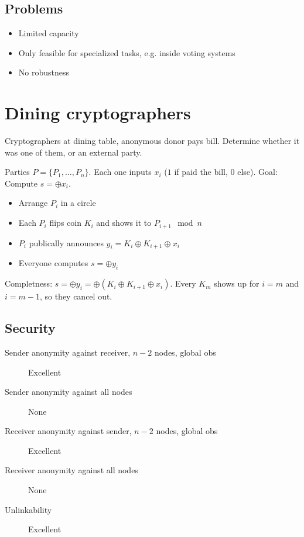\documentclass[a4paper]{scrreprt}
\begin{document}
\subsection{Problems}

\begin{itemize}
		\item Limited capacity
		\item Only feasible for specialized tasks, e.g. inside voting systems
		\item No robustness
\end{itemize}

\section{Dining cryptographers}

Cryptographers at dining table, anonymous donor pays bill. Determine whether it
was one of them, or an external party.

Parties $P = \{P_1, \ldots, P_n\}$. Each one inputs $x_i$ ($1$ if paid the
bill, $0$ else). Goal: Compute $s = \oplus x_i$.

\begin{itemize}
		\item Arrange $P_i$ in a circle
		\item Each $P_i$ flips coin $K_i$ and shows it to $P_{i+1} \mod n$
		\item $P_i$ publically announces $y_i = K_i \oplus K_{i+1} \oplus x_i$
		\item Everyone computes $s = \oplus y_i$
\end{itemize}

Completness: $s = \oplus y_i = \oplus (K_i \oplus K_{i+1} \oplus x_i)$. Every
$K_m$ shows up for $i=m$ and $i=m-1$, so they cancel out.

\subsection{Security}

\begin{description}
		\item[Sender anonymity against receiver, $n-2$ nodes, global obs] Excellent
		\item[Sender anonymity against all nodes] None
		\item[Receiver anonymity against sender, $n-2$ nodes, global obs] Excellent
		\item[Receiver anonymity against all nodes] None
		\item[Unlinkability] Excellent
\end{description}
\end{document}
